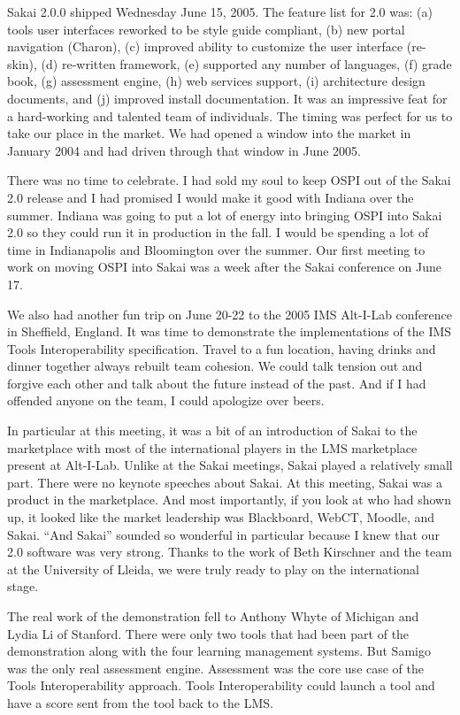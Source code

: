 \documentclass[12pt]{book}
\begin{document}
Sakai 2.0.0 shipped Wednesday June 15, 2005.  The feature list
for 2.0 was:
(a) tools user interfaces reworked to be style guide compliant,
(b) new portal navigation (Charon),
(c) improved ability to customize the user interface (re-skin),
(d) re-written framework,
(e) supported any number of languages,
(f) grade book,
(g) assessment engine,
(h) web services support,
(i) architecture design documents, and
(j) improved install documentation.
It was an impressive feat for a hard-working and talented
team of individuals.  The timing was perfect for us to take
our place in the market.  We had opened a window into the market
in January 2004 and had driven through that window in June 2005.

There was no time to celebrate. I had sold my soul to keep
OSPI out of the Sakai 2.0 release and I had promised I would
make it good with Indiana over the summer.  Indiana was going
to put a lot of energy into bringing OSPI into Sakai 2.0 so
they could run it in production in the fall. I would be spending
a lot of time in Indianapolis and Bloomington over the summer.
Our first meeting to work on moving OSPI into Sakai was a
week after the Sakai conference on June 17.

We also had another fun trip on June 20-22 to the 2005 IMS
Alt-I-Lab conference in Sheffield, England.  It was time to
demonstrate the implementations of the IMS Tools Interoperability
specification.  Travel to a fun location, having drinks and
dinner together always rebuilt team cohesion.  We could talk
tension out and forgive each other and talk about the future
instead of the past. And if I had offended anyone on the team,
I could apologize over beers.

In particular at this meeting, it was a bit of an
introduction of Sakai to the marketplace with most
of the international players in the LMS marketplace present
at Alt-I-Lab.  Unlike at the Sakai meetings, Sakai played
a relatively small part.   There were no keynote speeches about
Sakai.  At this meeting, Sakai was a product in the marketplace.  And most
importantly, if you look at who had shown up, it looked like
the market leadership was Blackboard, WebCT, Moodle, and
Sakai.  ``And Sakai'' sounded so wonderful in particular because
I knew that our 2.0 software was very strong.  Thanks to the
work of Beth Kirschner and the team at the University of Lleida,
we were truly ready to play on the international stage.

The real work of the demonstration fell to Anthony Whyte
of Michigan and Lydia Li of Stanford.   There were only two
tools that had been part of the demonstration along with the
four learning management systems.  But Samigo was the only
real assessment engine.  Assessment was the core use case
of the Tools Interoperability approach.  Tools Interoperability
could launch a tool and have a score sent from the tool back
to the LMS.
\end{document}

